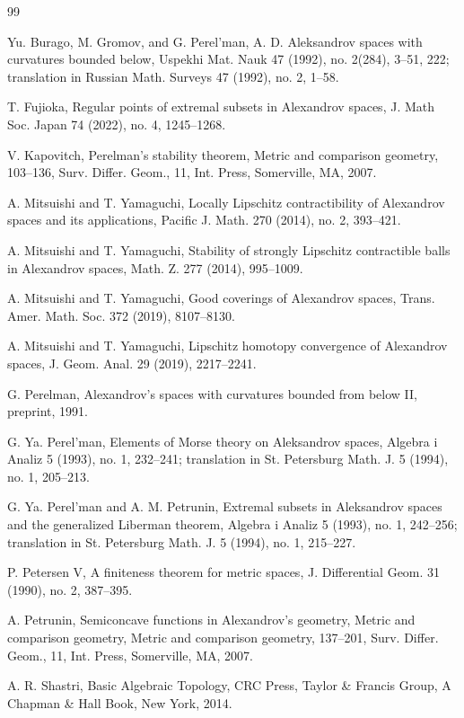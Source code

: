 \documentclass[a4paper,12pt]{amsart}
\theoremstyle{plain}
\theoremstyle{definition}
\numberwithin{thm}{section}
\numberwithin{equation}{section}
\begin{document}
\begin{thebibliography}{99}

Yu. Burago, M. Gromov, and G. Perel'man, A. D. Aleksandrov spaces with curvatures bounded below, Uspekhi Mat. Nauk 47 (1992), no. 2(284), 3--51, 222; translation in Russian Math. Surveys 47 (1992), no. 2, 1--58.

T. Fujioka, Regular points of extremal subsets in Alexandrov spaces, J. Math Soc. Japan 74 (2022), no. 4, 1245--1268.

V. Kapovitch, Perelman's stability theorem, Metric and comparison geometry, 103--136, Surv. Differ. Geom., 11, Int. Press, Somerville, MA, 2007.

A. Mitsuishi and T. Yamaguchi, Locally Lipschitz contractibility of Alexandrov spaces and its applications, Pacific J. Math. 270 (2014), no. 2, 393--421.

A. Mitsuishi and T. Yamaguchi, Stability of strongly Lipschitz contractible balls in Alexandrov spaces, Math. Z. 277 (2014), 995--1009. 

A. Mitsuishi and T. Yamaguchi, Good coverings of Alexandrov spaces, Trans. Amer. Math. Soc. 372 (2019), 8107--8130.

A. Mitsuishi and T. Yamaguchi, Lipschitz homotopy convergence of Alexandrov spaces, J. Geom. Anal. 29 (2019), 2217--2241.

G. Perelman, Alexandrov's spaces with curvatures bounded from below II, preprint, 1991.

G. Ya. Perel'man, Elements of Morse theory on Aleksandrov spaces, Algebra i Analiz 5 (1993), no. 1, 232--241; translation in St. Petersburg Math. J. 5 (1994), no. 1, 205--213.

G. Ya. Perel'man and A. M. Petrunin, Extremal subsets in Aleksandrov spaces and the generalized Liberman theorem, Algebra i Analiz 5 (1993), no. 1, 242--256; translation in St. Petersburg Math. J. 5 (1994), no. 1, 215--227.

P. Petersen V, A finiteness theorem for metric spaces, J. Differential Geom. 31 (1990), no. 2, 387--395.

A. Petrunin, Semiconcave functions in Alexandrov's geometry, Metric and comparison geometry, Metric and comparison geometry, 137--201, Surv. Differ. Geom., 11, Int. Press, Somerville, MA, 2007.

A. R. Shastri, Basic Algebraic Topology, CRC Press, Taylor \& Francis Group, A Chapman \& Hall Book, New York, 2014.


\end{thebibliography}
\end{document}
